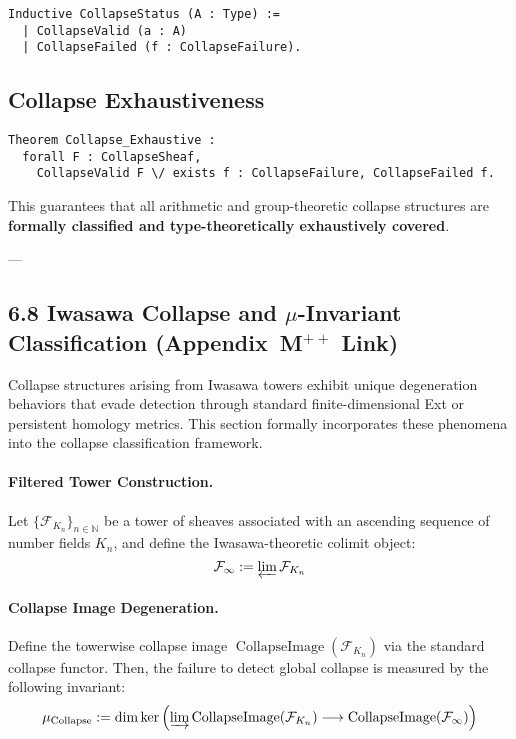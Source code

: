 \documentclass[11pt]{article}
\newcommand{\CollapseImage}{\operatorname{CollapseImage}}
\begin{document}
\begin{lstlisting}[language=Coq]
Inductive CollapseStatus (A : Type) :=
  | CollapseValid (a : A)
  | CollapseFailed (f : CollapseFailure).
\end{lstlisting}

\subsection*{Collapse Exhaustiveness}

\begin{lstlisting}[language=Coq]
Theorem Collapse_Exhaustive :
  forall F : CollapseSheaf,
    CollapseValid F \/ exists f : CollapseFailure, CollapseFailed f.
\end{lstlisting}


This guarantees that all arithmetic and group-theoretic collapse structures are \textbf{formally classified and type-theoretically exhaustively covered}.

---

\subsection*{6.8 Iwasawa Collapse and $\mu$-Invariant Classification (Appendix~M$^{++}$ Link)}

Collapse structures arising from Iwasawa towers exhibit unique degeneration behaviors that evade detection through standard finite-dimensional Ext or persistent homology metrics. This section formally incorporates these phenomena into the collapse classification framework.

\paragraph{Filtered Tower Construction.}
Let $\{ \mathcal{F}_{K_n} \}_{n \in \mathbb{N}}$ be a tower of sheaves associated with an ascending sequence of number fields $K_n$, and define the Iwasawa-theoretic colimit object:
\[
\mathcal{F}_\infty := \varprojlim \mathcal{F}_{K_n}
\]

\paragraph{Collapse Image Degeneration.}
Define the towerwise collapse image $\CollapseImage(\mathcal{F}_{K_n})$ via the standard collapse functor. Then, the failure to detect global collapse is measured by the following invariant:
\[
\mu_{\mathrm{Collapse}} := \dim \ker \left( \varinjlim \CollapseImage(\mathcal{F}_{K_n}) \longrightarrow \CollapseImage(\mathcal{F}_\infty) \right)
\]
\end{document}
